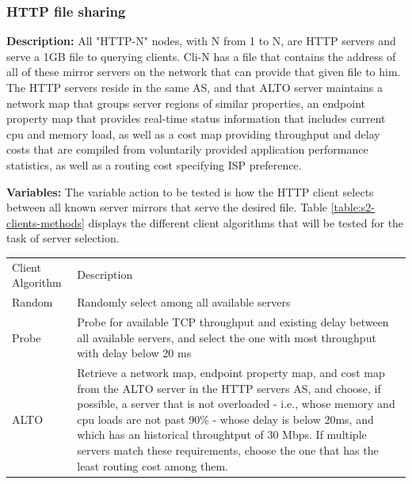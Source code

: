 \subsubsection{HTTP file sharing}

\textbf{Description: } All "HTTP-N" nodes, with N from 1 to N, are HTTP servers and serve a 1GB file to querying clients.
Cli-N has a file that contains the address of all of these mirror servers on the network that can provide that given file to him.
The HTTP servers reside in the same AS, and that ALTO server maintains a network map that groups server regions of similar properties, an endpoint property map that provides real-time status information that includes current cpu and memory load, as well as a cost map providing throughput and delay costs that are compiled from voluntarily provided application performance statistics, as well as a routing cost specifying ISP preference.

\textbf{Variables: } The variable action to be tested is how the HTTP client selects between all known server mirrors that serve the desired file.
Table \ref{table:s2-clients-methods} displays the different client algorithms that will be tested for the task of server selection.

\begin{table}[]
\begin{tabular}{ll}
Client Algorithm & Description                                                                                                                                                                                                \\
Random            & Randomly select among all available servers                                                                                                                                                                  \\
Probe             & Probe for available TCP throughput and existing delay between all available servers, and select the one with most throughput with delay below 20 ms
                                                             \\
ALTO              & Retrieve a network map, endpoint property map, and cost map from the ALTO server in the HTTP servers AS, and choose, if possible, a server that is not overloaded - i.e., whose memory and cpu loads are not past 90\% - whose delay is below 20ms, and which has an historical throughtput of 30 Mbps. If multiple servers match these requirements, choose the one that has the least routing cost among them.
\end{tabular}
\label{table:s1-tracker-methods}
\end{table}

